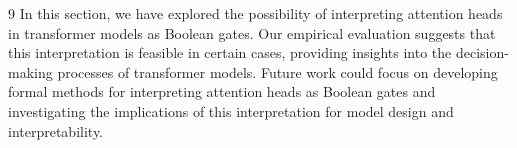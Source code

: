 \documentclass[11pt]{article}
\theoremstyle{definition}
\begin{document}
\begin{thebibliography}{9}
In this section, we have explored the possibility of interpreting attention heads in transformer models as Boolean gates. Our empirical evaluation suggests that this interpretation is feasible in certain cases, providing insights into the decision-making processes of transformer models. Future work could focus on developing formal methods for interpreting attention heads as Boolean gates and investigating the implications of this interpretation for model design and interpretability.






































































\end{thebibliography}
\end{document}
